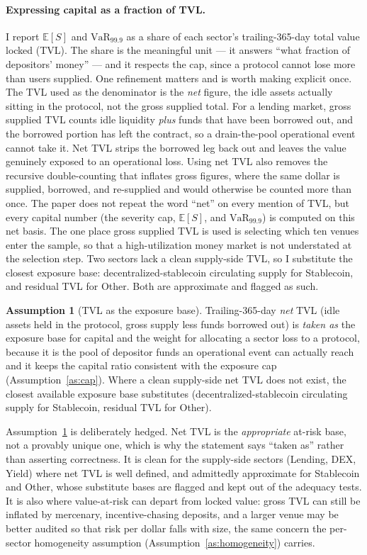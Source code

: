 \documentclass[11pt]{article}
\theoremstyle{definition}
\theoremstyle{remark}
\theoremstyle{definition}
\newtheorem{assumption}{Assumption}
\newcommand{\E}{\mathbb{E}}
\newcommand{\VaR}{\mathrm{VaR}}
\newcommand{\1}{\mathbf{1}}
\begin{document}
\paragraph{Expressing capital as a fraction of TVL.}
I report $\E[S]$ and $\VaR_{99.9}$ as a share of each sector's trailing-365-day
total value locked (TVL). The share is the meaningful unit --- it answers ``what
fraction of depositors' money'' --- and it respects the cap, since a protocol
cannot lose more than users supplied. One refinement matters and is worth making
explicit once. The TVL used as the denominator is the \emph{net} figure, the
idle assets actually sitting in the protocol, not the gross supplied total.
For a lending market, gross supplied TVL counts idle liquidity \emph{plus} funds
that have been borrowed out, and the borrowed portion has left the contract, so a
drain-the-pool operational event cannot take it. Net TVL strips the borrowed
leg back out and leaves the value genuinely exposed to an operational loss. Using
net TVL also removes the recursive double-counting that inflates gross figures,
where the same dollar is supplied, borrowed, and re-supplied and would otherwise
be counted more than once. The paper does not repeat the word ``net'' on every
mention of TVL, but every capital number (the severity cap, $\E[S]$, and
$\VaR_{99.9}$) is computed on this net basis. The one place gross supplied TVL is
used is selecting which ten venues enter the sample, so that a high-utilization
money market is not understated at the selection step. Two sectors lack a clean
supply-side TVL, so I substitute the closest exposure base: decentralized-stablecoin
circulating supply for Stablecoin, and residual TVL for Other. Both are
approximate and flagged as such.

\begin{assumption}[TVL as the exposure base]\label{as:tvlbase}
Trailing-365-day \emph{net} TVL (idle assets held in the protocol, gross supply
less funds borrowed out) is \emph{taken as} the exposure base for capital and the
weight for allocating a sector loss to a protocol, because it is the pool of
depositor funds an operational event can actually reach and it keeps the capital
ratio consistent with the exposure cap (Assumption~\ref{as:cap}). Where a clean
supply-side net TVL does not exist, the closest available exposure base
substitutes (decentralized-stablecoin circulating supply for Stablecoin, residual
TVL for Other).
\end{assumption}

\noindent Assumption~\ref{as:tvlbase} is deliberately hedged. Net TVL is the
\emph{appropriate} at-risk base, not a provably unique one, which is why the
statement says ``taken as'' rather than asserting correctness. It is clean for the
supply-side sectors (Lending, DEX, Yield) where net TVL is well defined, and
admittedly approximate for Stablecoin and Other, whose substitute bases are
flagged and kept out of the adequacy tests. It is also where value-at-risk can
depart from locked value: gross TVL can still be inflated by mercenary,
incentive-chasing deposits, and a larger venue may be better audited so that risk
per dollar falls with size, the same concern the per-sector homogeneity
assumption (Assumption~\ref{as:homogeneity}) carries.
\end{document}
